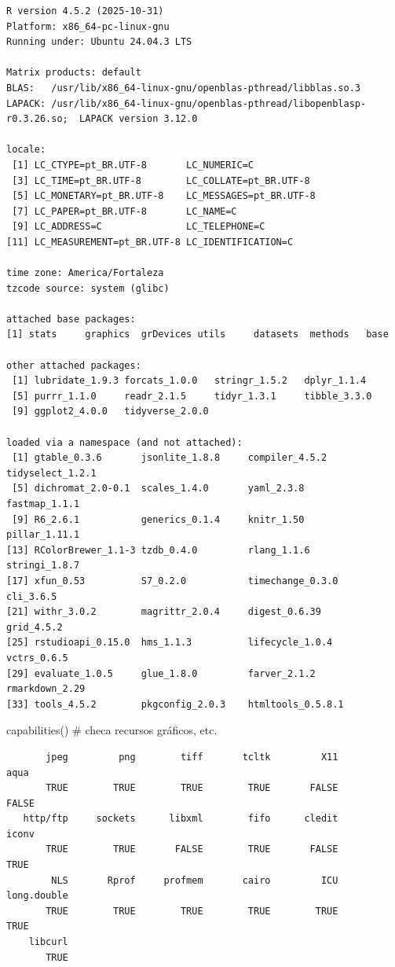 \documentclass[
  letterpaper,
  DIV=11,
  numbers=noendperiod]{scrreprt}
\newenvironment{Shaded}{\begin{snugshade}}{\end{snugshade}}
\newcommand{\CommentTok}[1]{\textcolor[rgb]{0.37,0.37,0.37}{#1}}
\newcommand{\FunctionTok}[1]{\textcolor[rgb]{0.28,0.35,0.67}{#1}}
\newcommand{\NormalTok}[1]{\textcolor[rgb]{0.00,0.23,0.31}{#1}}
\begin{document}
\begin{verbatim}
R version 4.5.2 (2025-10-31)
Platform: x86_64-pc-linux-gnu
Running under: Ubuntu 24.04.3 LTS

Matrix products: default
BLAS:   /usr/lib/x86_64-linux-gnu/openblas-pthread/libblas.so.3 
LAPACK: /usr/lib/x86_64-linux-gnu/openblas-pthread/libopenblasp-r0.3.26.so;  LAPACK version 3.12.0

locale:
 [1] LC_CTYPE=pt_BR.UTF-8       LC_NUMERIC=C              
 [3] LC_TIME=pt_BR.UTF-8        LC_COLLATE=pt_BR.UTF-8    
 [5] LC_MONETARY=pt_BR.UTF-8    LC_MESSAGES=pt_BR.UTF-8   
 [7] LC_PAPER=pt_BR.UTF-8       LC_NAME=C                 
 [9] LC_ADDRESS=C               LC_TELEPHONE=C            
[11] LC_MEASUREMENT=pt_BR.UTF-8 LC_IDENTIFICATION=C       

time zone: America/Fortaleza
tzcode source: system (glibc)

attached base packages:
[1] stats     graphics  grDevices utils     datasets  methods   base     

other attached packages:
 [1] lubridate_1.9.3 forcats_1.0.0   stringr_1.5.2   dplyr_1.1.4    
 [5] purrr_1.1.0     readr_2.1.5     tidyr_1.3.1     tibble_3.3.0   
 [9] ggplot2_4.0.0   tidyverse_2.0.0

loaded via a namespace (and not attached):
 [1] gtable_0.3.6       jsonlite_1.8.8     compiler_4.5.2     tidyselect_1.2.1  
 [5] dichromat_2.0-0.1  scales_1.4.0       yaml_2.3.8         fastmap_1.1.1     
 [9] R6_2.6.1           generics_0.1.4     knitr_1.50         pillar_1.11.1     
[13] RColorBrewer_1.1-3 tzdb_0.4.0         rlang_1.1.6        stringi_1.8.7     
[17] xfun_0.53          S7_0.2.0           timechange_0.3.0   cli_3.6.5         
[21] withr_3.0.2        magrittr_2.0.4     digest_0.6.39      grid_4.5.2        
[25] rstudioapi_0.15.0  hms_1.1.3          lifecycle_1.0.4    vctrs_0.6.5       
[29] evaluate_1.0.5     glue_1.8.0         farver_2.1.2       rmarkdown_2.29    
[33] tools_4.5.2        pkgconfig_2.0.3    htmltools_0.5.8.1 
\end{verbatim}

\begin{Shaded}
\begin{Highlighting}[]
\FunctionTok{capabilities}\NormalTok{()  }\CommentTok{\# checa recursos gráficos, etc.}
\end{Highlighting}
\end{Shaded}

\begin{verbatim}
       jpeg         png        tiff       tcltk         X11        aqua 
       TRUE        TRUE        TRUE        TRUE       FALSE       FALSE 
   http/ftp     sockets      libxml        fifo      cledit       iconv 
       TRUE        TRUE       FALSE        TRUE       FALSE        TRUE 
        NLS       Rprof     profmem       cairo         ICU long.double 
       TRUE        TRUE        TRUE        TRUE        TRUE        TRUE 
    libcurl 
       TRUE 
\end{verbatim}
\end{document}
